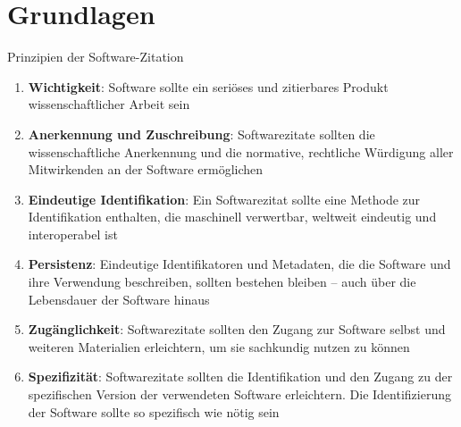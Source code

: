 \documentclass[%
    handout,
    aspectratio=1610,
    10pt,
    onlytextwidth, %
]{beamer}
\begin{document}
\section{Grundlagen}

\begin{frame}{Prinzipien der Software-Zitation \autocite{smith_software_2016}}
    \begin{enumerate}
        \item \textcolor{links}{\textbf{Wichtigkeit}}: Software sollte ein seriöses und zitierbares Produkt wissenschaftlicher Arbeit sein
        \item \textcolor{links}{\textbf{Anerkennung und Zuschreibung}}: Softwarezitate sollten die wissenschaftliche Anerkennung und die normative, rechtliche Würdigung aller Mitwirkenden an der Software ermöglichen
        \item \textcolor{links}{\textbf{Eindeutige Identifikation}}: Ein Softwarezitat sollte eine Methode zur Identifikation enthalten, die maschinell verwertbar, weltweit eindeutig und interoperabel ist
        \item \textcolor{links}{\textbf{Persistenz}}: Eindeutige Identifikatoren und Metadaten, die die Software und ihre Verwendung beschreiben, sollten bestehen bleiben – auch über die Lebensdauer der Software hinaus
        \item \textcolor{links}{\textbf{Zugänglichkeit}}: Softwarezitate sollten den Zugang zur Software selbst und weiteren Materialien erleichtern, um sie sachkundig nutzen zu können
        \item \textcolor{links}{\textbf{Spezifizität}}: Softwarezitate sollten die Identifikation und den Zugang zu der spezifischen Version der verwendeten Software erleichtern. Die Identifizierung der Software sollte so spezifisch wie nötig sein
    \end{enumerate}
\end{frame}
\end{document}

